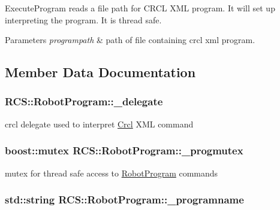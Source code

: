 Execute\-Program reads a file path for C\-R\-C\-L X\-M\-L program. It will set up interpreting the program. It is thread safe. 


\begin{DoxyParams}{Parameters}
{\em programpath} & path of file containing crcl xml program. \\
\hline
\end{DoxyParams}


\subsection{Member Data Documentation}
\hypertarget{classRCS_1_1RobotProgram_addf6e9d586d1fde1aa2b8105268d9e66}{
\subsubsection[{\-\_\-delegate}]{ R\-C\-S\-::\-Robot\-Program\-::\-\_\-delegate}}\label{classRCS_1_1RobotProgram_addf6e9d586d1fde1aa2b8105268d9e66}
crcl delegate used to interpret \hyperlink{namespaceCrcl}{Crcl} X\-M\-L command \hypertarget{classRCS_1_1RobotProgram_ad80469b94591e96c6a221e4769612668}{
\subsubsection[{\-\_\-progmutex}]{\setlength{\rightskip}{0pt plus 5cm}boost\-::mutex R\-C\-S\-::\-Robot\-Program\-::\-\_\-progmutex\hspace{0.3cm}{\ttfamily [static]}}}\label{classRCS_1_1RobotProgram_ad80469b94591e96c6a221e4769612668}
mutex for thread safe access to \hyperlink{classRCS_1_1RobotProgram}{Robot\-Program} commands \hypertarget{classRCS_1_1RobotProgram_aca7d780729e20c6d4e3988883b87527d}{
\subsubsection[{\-\_\-programname}]{\setlength{\rightskip}{0pt plus 5cm}std\-::string R\-C\-S\-::\-Robot\-Program\-::\-\_\-programname}}\label{classRCS_1_1RobotProgram_aca7d780729e20c6d4e3988883b87527d}
